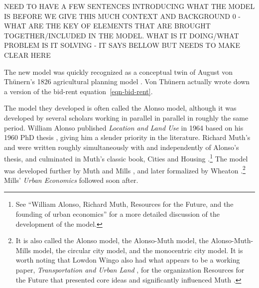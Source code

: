 {\color{red}  NEED TO HAVE A FEW SENTENCES INTRODUCING WHAT THE MODEL IS BEFORE WE GIVE THIS MUCH CONTEXT AND BACKGROUND 0 -  WHAT ARE THE KEY OF ELEMENTS THAT ARE BROUGHT TOGETHER/INCLUDED IN THE MODEL. WHAT IS IT DOING/WHAT PROBLEM IS IT SOLVING - IT SAYS BELLOW BUT NEEDS TO MAKE CLEAR HERE}

The new model was quickly recognized as a conceptual twin of August von Th\"unern's 1826 agricultural planning model \cite{vonthunenIsolirteStaatBeziehung1826}. Von Th\"unern actually wrote down a version of the bid-rent equation~\ref{eqn-bid-rent}.

The model they developed 
is often called the Alonso model, although it was developed by several scholars working in parallel in parallel in roughly the same period. William Alonso published \textit{Location and Land Use} in 1964  \cite{alonsoLocationLandUse1964} based on his 1960 PhD thesis \cite{alonsoModelUrbanLand1960},  
giving him a slender priority in the literature. 
Richard Muth's \cite{muthSpatialStructureHousing1961} and \cite{muthRationalExpectationsTheory1961} were written roughly simultaneously with and independently of Alonso's thesis, and culminated in Muth's classic book, Cities and Housing  \cite{muthCitiesHousingSpatial1969}.\footnote{See ``William Alonso, Richard Muth, Resources for  the Future, and the founding of urban economics''\cite{mcdonaldWilliamAlonsoRichard2007} for a more detailed discussion of the development of the model.}  %
 The model was developed further by Muth \cite{muthCitiesHousingSpatial1969} and Mills \cite{millsAggregativeModelResource1967}, and later formalized by Wheaton \cite{wheatonComparativeStaticAnalysis1974}.\footnote{It is also called the Alonso model, the Alonso-Muth model, the Alonso-Muth-Mills model, the circular city model, and the monocentric city model. %
It is worth noting that Lowdon Wingo also had what appears to be a working paper, \textit{Transportation and Urban Land} \cite{wingoTransportationUrbanLand1961}, for the organization Resources for the Future %
that presented core ideas and significantly influenced Muth \cite{mcdonaldWilliamAlonsoRichard2007}.} Mills' \textit{Urban Economics} \cite{millsUrbanEconomics1972} followed soon after. 

